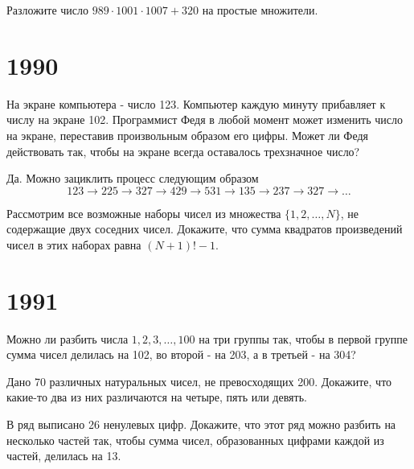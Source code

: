\documentclass[11pt, a4paper]{common/document_template}
\begin{document}
\begin{exercise}[42]
Разложите число $989 \cdot 1001 \cdot 1007 + 320$ на простые множители.
\end{exercise}

\chapter{1990}

\begin{exercise}[9]
На экране компьютера - число 123. Компьютер каждую минуту прибавляет к числу на экране 102. Программист Федя в любой момент может изменить число на экране, переставив произвольным образом его цифры. Может ли Федя действовать так, чтобы на экране всегда оставалось трехзначное число?
\end{exercise}

\begin{Solution}
Да. Можно зациклить процесс следующим образом
$$
123 \rightarrow 225 \rightarrow 327 \rightarrow 429 \rightarrow 531 \rightarrow 135 \rightarrow 237 \rightarrow 327 \rightarrow \dots 
$$
\end{Solution}

\begin{exercise}[46]
Рассмотрим все возможные наборы чисел из множества $\{1, 2, \dots, N\}$, не содержащие двух соседних чисел. Докажите, что сумма квадратов произведений чисел в этих наборах равна $(N + 1)! - 1$.
\end{exercise}

\chapter{1991}

\begin{exercise}[36]
Можно ли разбить числа $1, 2, 3, \dots, 100$ на три группы так, чтобы в первой группе сумма чисел делилась на 102, во второй - на 203, а в третьей - на 304?
\end{exercise}

\begin{exercise}[42]
Дано 70 различных натуральных чисел, не превосходящих 200. Докажите, что какие-то два из них различаются на четыре, пять или девять.
\end{exercise}

\begin{Solution}

\end{Solution}

\begin{exercise}[47]
В ряд выписано 26 ненулевых цифр. Докажите, что этот ряд можно разбить на несколько частей так, чтобы сумма чисел, образованных цифрами каждой из частей, делилась на 13.
\end{exercise}
\end{document}

